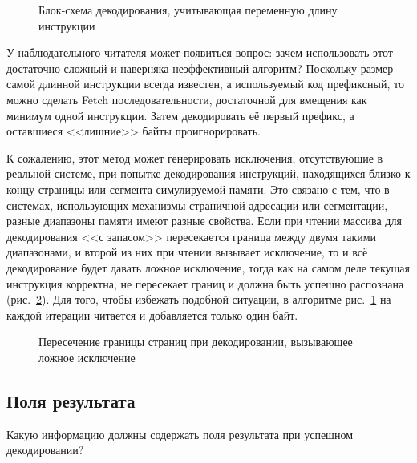 \begin{figure}[htb]
    \centering
    \caption{Блок-схема декодирования, учитывающая переменную длину инструкции}
    \label{fig:variable-length}
\end{figure}

У наблюдательного читателя может появиться вопрос: зачем использовать этот достаточно сложный и наверняка неэффективный алгоритм? Поскольку размер самой длинной инструкции всегда известен, а используемый код префиксный, то можно сделать Fetch последовательности, достаточной для вмещения как минимум одной инструкции. Затем декодировать её первый префикс, а оставшиеся <<лишние>> байты проигнорировать.

К сожалению, этот метод может генерировать исключения, отсутствующие в реальной системе, при попытке декодирования инструкций, находящихся близко к концу страницы или сегмента симулируемой памяти. Это связано с тем, что в системах, использующих механизмы страничной адресации или сегментации, разные диапазоны памяти имеют разные свойства. Если при чтении массива для декодирования <<с запасом>> пересекается граница между двумя такими диапазонами, и второй из них при чтении вызывает исключение, то и всё декодирование будет давать ложное исключение, тогда как на самом деле текущая инструкция корректна, не пересекает границ и должна быть успешно распознана (рис.~\ref{fig:page-crossing-decode}). Для того, чтобы избежать подобной ситуации, в алгоритме рис.~\ref{fig:variable-length} на каждой итерации читается и добавляется только один байт.

\begin{figure}[htb]
    \centering
    \caption[Пересечение границы страниц при декодировании]{Пересечение границы страниц при декодировании, вызывающее ложное исключение}
    \label{fig:page-crossing-decode}
\end{figure}

\subsection{Поля результата}

Какую информацию должны содержать поля результата при успешном декодировании?

